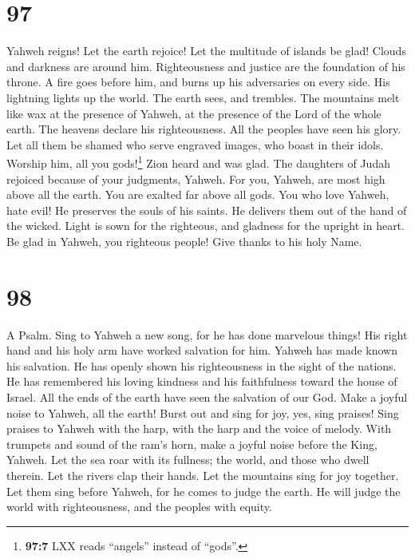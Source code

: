 \hypertarget{section-89}{%
\section{97}\label{section-89}}

 Yahweh reigns! Let the earth rejoice! Let the multitude
of islands be glad!  Clouds and darkness are around him.
Righteousness and justice are the foundation of his throne.
 A fire goes before him, and burns up his adversaries on
every side.  His lightning lights up the world. The earth
sees, and trembles.  The mountains melt like wax at the
presence of Yahweh, at the presence of the Lord of the whole earth.
 The heavens declare his righteousness. All the peoples
have seen his glory.  Let all them be shamed who serve
engraved images, who boast in their idols. Worship him, all you
gods!\footnote{\textbf{97:7} LXX reads ``angels'' instead of ``gods''.}
 Zion heard and was glad. The daughters of Judah rejoiced
because of your judgments, Yahweh.  For you, Yahweh, are
most high above all the earth. You are exalted far above all gods.
 You who love Yahweh, hate evil! He preserves the souls
of his saints. He delivers them out of the hand of the wicked.
 Light is sown for the righteous, and gladness for the
upright in heart.  Be glad in Yahweh, you righteous
people! Give thanks to his holy Name.

\hypertarget{section-90}{%
\section{98}\label{section-90}}

A Psalm.  Sing to Yahweh a new song, for he has done
marvelous things! His right hand and his holy arm have worked salvation
for him.  Yahweh has made known his salvation. He has
openly shown his righteousness in the sight of the nations.
 He has remembered his loving kindness and his
faithfulness toward the house of Israel. All the ends of the earth have
seen the salvation of our God.  Make a joyful noise to
Yahweh, all the earth! Burst out and sing for joy, yes, sing praises!
 Sing praises to Yahweh with the harp, with the harp and
the voice of melody.  With trumpets and sound of the ram's
horn, make a joyful noise before the King, Yahweh.  Let
the sea roar with its fullness; the world, and those who dwell therein.
 Let the rivers clap their hands. Let the mountains sing
for joy together.  Let them sing before Yahweh, for he
comes to judge the earth. He will judge the world with righteousness,
and the peoples with equity.

